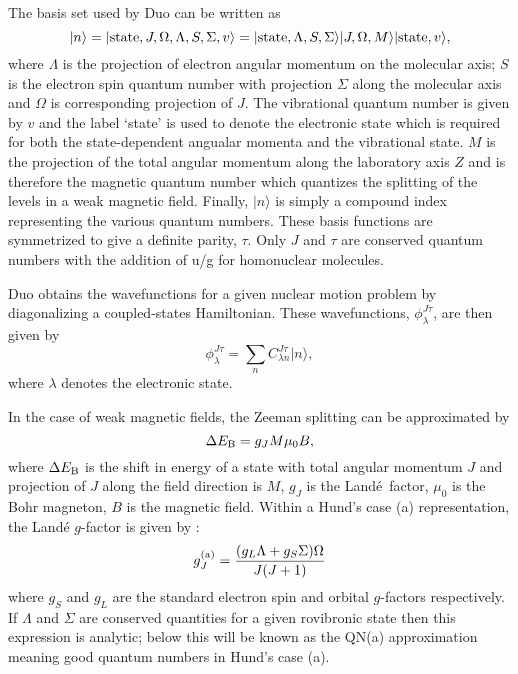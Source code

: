 \documentclass[preprint,review,12pt]{elsarticle}
\newcommand{\2}{$_{2}$}
\newcommand{\3}{$_{3}$}
\newcommand{\4}{$_{4}$}
\newcommand{\8}{$^{18}$}
\newcommand{\6}{$^{16}$}
\newcommand{\7}{$^{17}$}
\newcommand{\lande}{Land\'e}
\newcommand{\ket}[1]{\vert #1 \rangle  }
\begin{document}
The basis set used by {\sc Duo} can be written as
\begin{equation}\label{e:basis}
 \ket{n} =  \ket{{\rm state}, J, \Omega, \Lambda, S, \Sigma, v }  =  \ket{ {\rm state},
\Lambda, S, \Sigma  } \ket{ J,\Omega,M  \rangle |{\rm state}, v },
\end{equation}
where  $\Lambda$ is the projection of electron angular momentum on
the molecular axis;
$S$ is the electron spin quantum number with projection
$\Sigma$ along the  molecular axis and  $\Omega$ is corresponding
projection of $J$. The vibrational quantum number is given
by $v$ and the label `state' is used to  denote
the electronic state which is required for both the state-dependent
angualar momenta and the vibrational state.
$M$ is the projection of the total angular momentum along the
laboratory axis $Z$ and is therefore the magnetic quantum number
which quantizes the splitting of the levels in a weak
magnetic field. Finally, $\ket{n}$ is simply a compound index representing
the various quantum numbers. These basis functions are symmetrized
to give a definite parity, $\tau$. Only $J$ and $\tau$ are conserved
quantum numbers with the addition of  u/g for homonuclear molecules.

{\sc Duo} obtains the wavefunctions for a given nuclear motion problem
by diagonalizing a coupled-states Hamiltonian. These wavefunctions,
$\phi_{\lambda}^{J\tau}$, are then given by
\begin{equation}
\label{equation:DUO_wavefunction}
\phi_{\lambda}^{J\tau}=\sum_{n}{C_{\lambda n}^{J\tau}\ket{n}},
\end{equation}
where $\lambda$ denotes the electronic state.

In the case of weak magnetic fields, the Zeeman splitting can be approximated by
\begin{equation}\label{e:Zeeman}
  \Delta E_{\rm B} = g_J M \mu_0 B,
\end{equation}
where $\Delta E_{\rm B}$ is the shift in energy of a state with total
angular momentum $J$ and projection of $J$ along the field direction
is $M$,  $g_J$ is the \lande\ factor, $\mu_0$ is the Bohr magneton,
$B$ is the magnetic field.  Within a Hund's case (a) representation,
the Land\'e $g$-factor is given by
\cite{90GrLiFi.NiH,02BeSoxx.diatom}:
\begin{equation}
\label{equation:lande_hunds_a}
g_J^{\rm (a)}=\frac{(g_L\Lambda+g_S\Sigma)\Omega }{J(J+1)}
\end{equation}
where $g_S$ and $g_L$ are the standard
electron spin and orbital $g$-factors respectively. If $\Lambda$ and
$\Sigma$ are conserved quantities for a given rovibronic state then
this expression is analytic; below this will be known as the
QN(a) approximation meaning good  quantum numbers in Hund's case (a).
\end{document}
